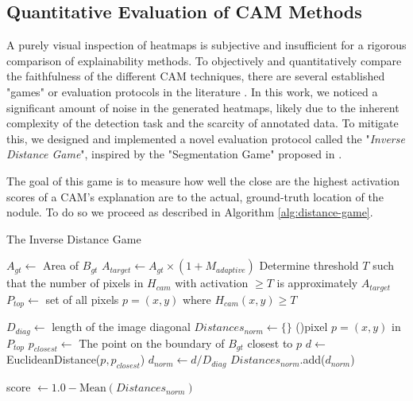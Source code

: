 \subsection{Quantitative Evaluation of CAM Methods}
\label{subsec:xai_evaluation}

A purely visual inspection of heatmaps is subjective and insufficient for a rigorous comparison of explainability methods. To objectively and quantitatively compare the faithfulness of the different CAM techniques, there are several established "games" or evaluation protocols in the literature \cite{selvaraju2019gradcam,chattopadhay_2018gradcam++,wang2020score}. In this work, we noticed a significant amount of noise in the generated heatmaps, likely due to the inherent complexity of the detection task and the scarcity of annotated data.
To mitigate this, we designed and implemented a novel evaluation protocol called the "\textit{Inverse Distance Game}", inspired by the "Segmentation Game" proposed in \cite{chattopadhay_2018gradcam++}.

The goal of this game is to measure how well the close are the highest activation scores of a CAM's explanation are to the actual, ground-truth location of the nodule. To do so we proceed as described in Algorithm \ref{alg:distance-game}.

\begin{algorithm}[H]
    \caption{The Inverse Distance Game}
    \label{alg:distance-game}
    \DontPrintSemicolon
    \SetAlgoLined

    
    \BlankLine
    
    $A_{gt} \gets$ Area of $B_{gt}$\;
    $A_{target} \gets A_{gt} \times (1 + M_{adaptive})$\;
    Determine threshold $T$ such that the number of pixels in $H_{cam}$ with activation $\ge T$ is approximately $A_{target}$\;
    $P_{top} \gets$ set of all pixels $p=(x, y)$ where $H_{cam}(x, y) \ge T$\;

    \BlankLine

    $D_{diag} \gets$ length of the image diagonal\;
    $Distances_{norm} \gets \{\}$\;
    \ForAll(){pixel $p=(x, y)$ \textup{in} $P_{top}$}{
        $p_{closest} \gets$ The point on the boundary of $B_{gt}$ closest to $p$\;
        $d \gets$ EuclideanDistance($p, p_{closest}$)\;
        $d_{norm} \gets d / D_{diag}$\;
        $Distances_{norm}$.add($d_{norm}$)\;
    }

    \BlankLine
    score $\gets 1.0 - \text{Mean}(Distances_{norm})$\;
    \;
\end{algorithm}

